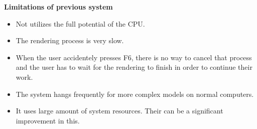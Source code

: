 {\bf {Limitations of previous system }}
\begin{itemize}
	\item Not utilizes the full potential of the CPU.
	\item The rendering process is very slow.
	\item When the user accidentely presses F6, there is no way to cancel that process and the user has to wait for the rendering to finish in order to continue their work.
	\item The system hangs frequently for more complex models on normal computers.
	\item It uses large amount of system resources. Their can be a significant improvement in this.
\end{itemize}
